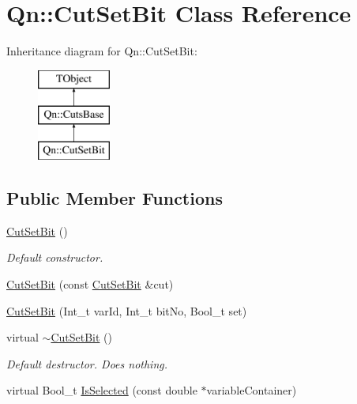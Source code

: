 \hypertarget{classQn_1_1CutSetBit}{}\section{Qn\+:\+:Cut\+Set\+Bit Class Reference}
\label{classQn_1_1CutSetBit}
Inheritance diagram for Qn\+:\+:Cut\+Set\+Bit\+:\begin{figure}[H]
\begin{center}
\leavevmode
\includegraphics[height=3.000000cm]{classQn_1_1CutSetBit}
\end{center}
\end{figure}
\subsection*{Public Member Functions}
\begin{DoxyCompactItemize}
\item 
\mbox{\label{classQn_1_1CutSetBit_a756c100ffa84f2b94d426582c0d423a7}} 
\mbox{\hyperlink{classQn_1_1CutSetBit_a756c100ffa84f2b94d426582c0d423a7}{Cut\+Set\+Bit}} ()
\begin{DoxyCompactList}\small\item\em Default constructor. \end{DoxyCompactList}\item 
\mbox{\hyperlink{classQn_1_1CutSetBit_adb4e4a353d808dac2bdeeeb534600444}{Cut\+Set\+Bit}} (const \mbox{\hyperlink{classQn_1_1CutSetBit}{Cut\+Set\+Bit}} \&cut)
\item 
\mbox{\hyperlink{classQn_1_1CutSetBit_af27d1e31ca426cd6c8eba43ffcd099c1}{Cut\+Set\+Bit}} (Int\+\_\+t var\+Id, Int\+\_\+t bit\+No, Bool\+\_\+t set)
\item 
\mbox{\label{classQn_1_1CutSetBit_a712e41a80433dda2a5afab70e09e744b}} 
virtual \mbox{\hyperlink{classQn_1_1CutSetBit_a712e41a80433dda2a5afab70e09e744b}{$\sim$\+Cut\+Set\+Bit}} ()
\begin{DoxyCompactList}\small\item\em Default destructor. Does nothing. \end{DoxyCompactList}\item 
virtual Bool\+\_\+t \mbox{\hyperlink{classQn_1_1CutSetBit_a8881f7abf183ff353492a3c96862081e}{Is\+Selected}} (const double $\ast$variable\+Container)
\end{DoxyCompactItemize}
